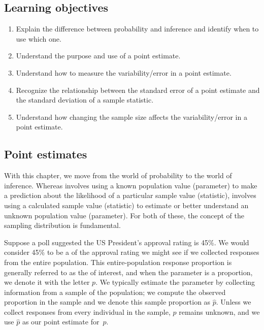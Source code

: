 \subsection*{Learning objectives}
\begin{enumerate}
\item Explain the difference between probability and inference and identify when to use which one.

\item Understand the purpose and use of a point estimate.

\item Understand how to measure the variability/error in a point estimate.

\item Recognize the relationship between the standard error of a point estimate and the standard deviation of a sample statistic.

\item Understand how changing the sample size affects the variability/error in a point estimate.
\end{enumerate}



\subsection{Point estimates}

With this chapter, we move from the world of probability to the world of inference.  Whereas  involves using a known population value (parameter) to make a prediction about the likelihood of a particular sample value (statistic),  involves using a calculated sample value (statistic) to estimate or better understand an unknown population value (parameter).  For both of these, the concept of the sampling distribution is fundamental.  

Suppose a poll suggested the US President's approval
rating is 45\%.
We would consider 45\% to be a
 of the approval
rating we might see if we collected responses from the
entire population.  This entire-population response proportion is
generally referred to as the 
of interest,
and when the parameter is a proportion,
we denote it with the letter $p$. We typically estimate the parameter by collecting
information from a sample of the population;
we compute the observed proportion in the sample and we denote this sample proportion as $\hat{p}$.  Unless we collect responses from every individual in the sample,
$p$ remains unknown, and we use $\hat{p}$ as our point estimate for~$p$.

